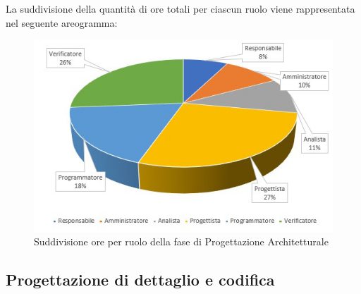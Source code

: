La suddivisione della quantità di ore totali per ciascun ruolo viene rappresentata nel seguente areogramma:

\begin{figure}[h]
	\centering
	
	
	\includegraphics[scale=2.5]{Sezioni/Aerogrammi/AerogrammaProgettArchitetturale.png}
	\caption{Suddivisione ore per ruolo della fase di Progettazione Architetturale}
\end{figure}

\clearpage
\subsection{Progettazione di dettaglio e codifica}

